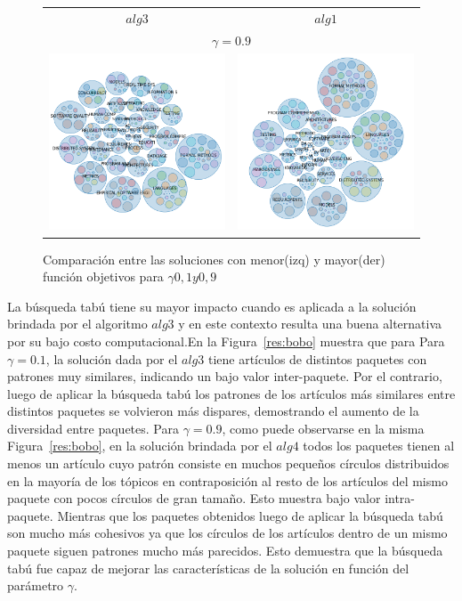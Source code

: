 \begin{figure}[H]
\begin{tabular}{cc}
			$alg3$ & $alg1$\\
		\multicolumn{2}{c}{$\gamma=0.9$}\\
			\includegraphics[width=0.5\linewidth]{img/gamma-09-burbujas-alg-3.png}&
			\includegraphics[width=0.5\linewidth]{img/gamma-09-burbujas-alg-1.png}\\
	\end{tabular}
	\caption{Comparación entre las soluciones con menor(izq) y mayor(der) función objetivos  para $\gamma 0,1 y 0,9$}
	\label{res:comp1}
\end{figure}

La búsqueda tabú tiene su mayor impacto cuando es aplicada a la solución brindada por el algoritmo $alg3$ y en este contexto resulta una buena alternativa por su bajo costo computacional.En la Figura~\ref{res:bobo} muestra que para Para $\gamma=0.1$, la solución dada por el $alg3$ tiene artículos de distintos paquetes con patrones muy similares, indicando un bajo valor inter-paquete. Por el contrario, luego de aplicar la búsqueda tabú los patrones de los artículos más similares entre distintos paquetes se volvieron más dispares, demostrando el aumento de la diversidad entre paquetes. Para $\gamma=0.9$, como puede observarse en la misma Figura~\ref{res:bobo}, en la solución brindada por el $alg4$ todos los paquetes tienen al menos un artículo cuyo patrón consiste en muchos pequeños círculos distribuidos en la mayoría de los tópicos en contraposición al resto de los artículos del mismo paquete con pocos círculos de gran tamaño. Esto muestra bajo valor intra-paquete. Mientras que los paquetes obtenidos luego de aplicar la búsqueda tabú son mucho más cohesivos ya que los círculos de los artículos dentro de un mismo paquete siguen patrones mucho más parecidos. Esto demuestra que la búsqueda tabú fue capaz de mejorar las características de la solución en función del parámetro $\gamma$.

